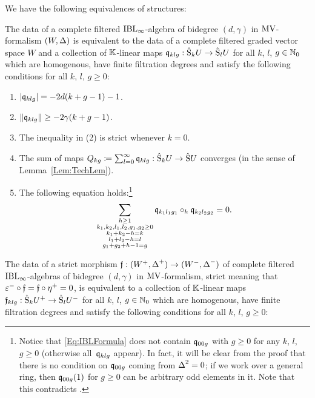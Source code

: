 \documentclass[\MainFolder/Text.tex]{subfiles}
\begin{document}
\begin{Proposition}\label{Prop:EqCharOfMVIBL}
We have the following equivalences of structures:
\begin{ClaimList}
\item The data of a complete filtered $\mathrm{IBL}_\infty$-algebra of bidegree $(d,\gamma)$ in $\mathrm{MV}$-formalism $(W,\operatorname{\Delta})$ is equivalent to the data of a complete filtered graded vector space $W$ and a collection of $\mathbb{K}$-linear maps $\mathfrak{q}_{klg}: \hat{\mathrm{S}}_k U \rightarrow \hat{\mathrm{S}}_l U$ for all $k$, $l$, $g\in \mathbb{N}_0$ which are homogenous, have finite filtration degrees and satisfy the following conditions for all $k$, $l$, $g\ge 0$:
\begin{enumerate}[label=(\arabic*)]
\item  $|\mathfrak{q}_{klg}| = -2d(k+g-1) - 1$.
\item $\| \mathfrak{q}_{klg} \|\ge -2\gamma(k+g-1)$.
\item The inequality in (2) is strict whenever $k=0$.
\item The sum of maps $Q_{kg} \coloneqq \sum_{l=0}^\infty \mathfrak{q}_{klg}: \hat{\mathrm{S}}_k U \rightarrow \hat{\mathrm{S}}U$ converges (in the sense of Lemma~\ref{Lem:TechLem}).
\item The following equation holds:\footnote{Notice that \eqref{Eq:IBLFormula} does not contain $\mathfrak{q}_{00g}$ with $g\ge 0$ for any $k$, $l$, $g\ge 0$ (otherwise all~$\mathfrak{q}_{klg}$ appear). In fact, it will be clear from the proof that there is no condition on $\mathfrak{q}_{00g}$ coming from $\operatorname{\Delta}^2 = 0$; if we work over a general ring, then $\mathfrak{q}_{00g}(1)$ for $g\ge 0$ can be arbitrary odd elements in it. Note that this contradicts \cite[p.\,47, bottom-most paragraph]{Cieliebak2015}.}
\begin{equation}\label{Eq:IBLFormula}
 \sum_{\substack{h \ge 1 \\ k_1, k_2, l_1, l_2, g_1, g_2 \ge 0 \\ k_1 + k_2 - h = k \\ l_1 + l_2 - h = l \\ g_1 + g_2 + h-1 = g}} \mathfrak{q}_{k_1 l_1 g_1}\circ_h \mathfrak{q}_{k_2 l_2 g_2} = 0.
\end{equation}
\end{enumerate}
\item The data of a strict morphism $\mathfrak{f}: (W^+,\operatorname{\Delta}^+)\rightarrow(W^-,\operatorname{\Delta}^-)$ of complete filtered $\mathrm{IBL}_\infty$-algebras of bidegree $(d,\gamma)$ in $\mathrm{MV}$-formalism, strict meaning that $\varepsilon^- \circ \mathfrak{f} = \mathfrak{f} \circ \eta^+ = 0$, is equivalent to a collection of $\mathbb{K}$-linear maps $\mathfrak{f}_{klg}: \hat{\mathrm{S}}_k U^+ \rightarrow \hat{\mathrm{S}}_l U^-$ for all $k$, $l$, $g\in \mathbb{N}_0$ which are homogenous, have finite filtration degrees and satisfy the following conditions for all $k$, $l$, $g\ge 0$:

\end{ClaimList}
\end{Proposition}
\end{document}
